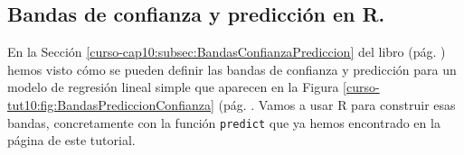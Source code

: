 \documentclass[10pt,a4paper]{article}\usepackage[]{graphicx}\usepackage[]{color}
\newcounter {cont01}
\begin{document}
%

\subsection{Bandas de confianza y predicción en R.}

En la Sección \ref{curso-cap10:subsec:BandasConfianzaPrediccion} del libro (pág. \pageref{curso-cap10:subsec:BandasConfianzaPrediccion}) hemos visto cómo se pueden definir las bandas de confianza y predicción para un modelo de regresión lineal simple que aparecen en la Figura \ref{curso-tut10:fig:BandasPrediccionConfianza} (pág. \pageref{curso-tut10:fig:BandasPrediccionConfianza}. Vamos a usar R para construir esas bandas, concretamente con la función {\tt predict} que ya hemos encontrado en la página \pageref{tut10:subsubsec:UsandoLmPredecirValores} de este tutorial.
\end{document}
